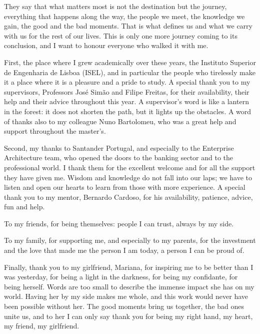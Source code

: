 \acknowledgements
They say that what matters most is not the destination but the journey,
everything that happens along the way, the people we meet, the knowledge we gain, the good and the bad moments. That is what defines us and what we carry with us for the rest of our lives.
This is only one more journey coming to its conclusion,
and I want to honour everyone who walked it with me.

First, the place where I grew academically over these years, the Instituto Superior de Engenharia de Lisboa (ISEL),
and in particular the people who tirelessly make it a place where it is a pleasure and a pride to study. A special thank you to my supervisors, Professors José Simão and Filipe Freitas, for their
availability, their help and their advice throughout this year. A supervisor's word is like a lantern in the forest: it does not shorten the path, but it lights up the obstacles.
A word of thanks also to my colleague Nuno Bartolomeu, who was a great help and support throughout the master's.

Second, my thanks to Santander Portugal, and especially to the Enterprise Architecture team,
who opened the doors to the banking sector and to the professional world. I thank them for the excellent welcome
and for all the support they have given me. Wisdom and knowledge do not fall into our laps; we have to
listen and open our hearts to learn from those with more experience. A special thank you to my mentor, Bernardo Cardoso,
for his availability, patience, advice, fun and help.

To my friends, for being themselves: people I can trust, always by my side.

To my family, for supporting me, and especially to my parents, for the investment and the love
that made me the person I am today, a person I can be proud of.

Finally, thank you to my girlfriend, Mariana, for inspiring me to be better than I was yesterday,
for being a light in the darkness, for being my confidante, for being herself. Words are too small
to describe the immense impact she has on my world. Having her by my side makes me whole, and this work would never
have been possible without her. The good moments bring us together, the bad ones unite us, and to her I can only say thank you for being my
right hand, my heart, my friend, my girlfriend.
